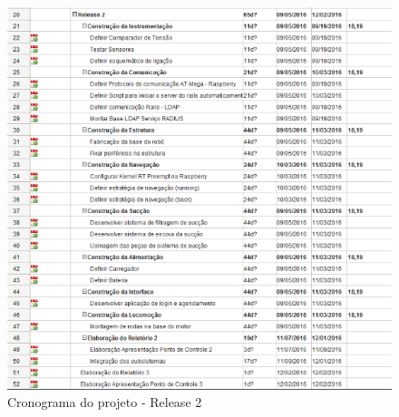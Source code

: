 		\begin{figure}[H]
			\centering
			\includegraphics[scale=0.8]{figuras/cronograma2.png}
			\caption{Cronograma do projeto - Release 2}
			\label{img:cronograma2}
		\end{figure}

		
